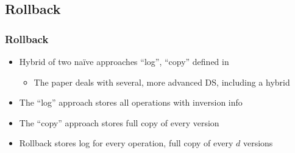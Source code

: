\documentclass[compress]{beamer}
\begin{document}
\begin{frame}
\begin{figure}
\end{figure}
\end{frame}

\subsection{Rollback}
\begin{frame}
\frametitle{Rollback}
\begin{itemize}
  \item Hybrid of two na\"ive approaches ``log'', ``copy'' defined in \cite{Tsotras1995237}
  \begin{itemize}
    \item The paper deals with several, more advanced DS, including a hybrid
  \end{itemize}
  \pause
  \item The ``log'' approach stores all operations with inversion info
  \pause
  \item The ``copy'' approach stores full copy of every version
  \pause
  \item Rollback stores log for every operation, full copy of every $d$ versions
\end{itemize}
\end{frame}
\end{document}
